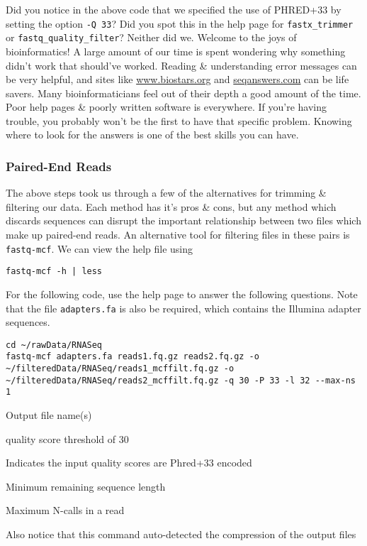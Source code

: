 \begin{advanced}
Did you notice in the above code that we specified the use of PHRED+33 by setting the option \texttt{-Q 33}?
Did you spot this in the help page for \texttt{fastx_trimmer} or \texttt{fastq_quality_filter}?
Neither did we.
Welcome to the joys of bioinformatics!
A large amount of our time is spent wondering why something didn't work that should've worked.
Reading \& understanding error messages can be very helpful, and sites like \url{www.biostars.org} and \url{seqanswers.com} can be life savers.
Many bioinformaticians feel out of their depth a good amount of the time.
Poor help pages \& poorly written software is everywhere.
If you're having trouble, you probably won't be the first to have that specific problem.
Knowing where to look for the answers is one of the best skills you can have.
\end{advanced}


\subsubsection{Paired-End Reads}
\begin{information}
The above steps took us through a few of the alternatives for trimming \& filtering our data.
Each method has it's pros \& cons, but any method which discards sequences can disrupt the important relationship between two files which make up paired-end reads.
An alternative tool for filtering files in these pairs is \texttt{fastq-mcf}.
We can view the help file using
\begin{lstlisting}
fastq-mcf -h | less
\end{lstlisting}
\end{information}

\begin{steps}
For the following code, use the help page to answer the following questions.
Note that the file \texttt{adapters.fa} is also be required, which contains the Illumina adapter sequences.
\begin{lstlisting}
cd ~/rawData/RNASeq
fastq-mcf adapters.fa reads1.fq.gz reads2.fq.gz -o ~/filteredData/RNASeq/reads1_mcffilt.fq.gz -o ~/filteredData/RNASeq/reads2_mcffilt.fq.gz -q 30 -P 33 -l 32 --max-ns 1  
\end{lstlisting}
\end{steps}

\begin{note}
\begin{description}[style=multiline,labelindent=0cm,align=right,leftmargin=0.8\descriptionlabelspace,rightmargin=1.5cm,font=\ttfamily]
\item[-o] Output file name(s)
\item[-q 30] quality score threshold of 30
\item[-P 33] Indicates the input quality scores are Phred+33 encoded
\item[-l 32] Minimum remaining sequence length
\item[--max-ns 1] Maximum N-calls in a read
\end{description}
Also notice that this command auto-detected the compression of the output files
\end{note}

